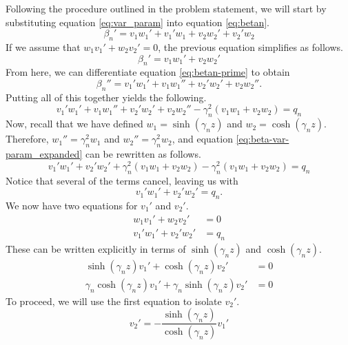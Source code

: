 Following the procedure outlined in the problem statement, we will start by substituting equation \eqref{eq:var_param} into equation \eqref{eq:betan}.
\begin{equation}
    \beta_n' = v_1 w_1' + v_1' w_1 + v_2 w_2' + v_2' w_2
\end{equation}
If we assume that $w_1 v_1' + w_2 v_2' = 0$, the previous equation simplifies as follows.
\begin{equation}
    \beta_n' = v_1 w_1' + v_2 w_2'
    \label{eq:betan-prime}
\end{equation}
From here, we can differentiate equation \eqref{eq:betan-prime} to obtain
\begin{equation}
    \beta_n'' = v_1' w_1' + v_1 w_1'' + v_2' w_2' + v_2 w_2''.
\end{equation}
Putting all of this together yields the following.
\begin{equation}
    v_1' w_1' + v_1 w_1'' + v_2' w_2' + v_2 w_2'' - \gamma_n^2(v_1 w_1 + v_2 w_2) = q_n
    \label{eq:beta-var-param_expanded}
\end{equation}
Now, recall that we have defined $w_1 = \sinh(\gamma_n z)$ and $w_2 = \cosh(\gamma_n z)$. Therefore, $w_1'' = \gamma_n^2 w_1$ and $w_2'' = \gamma_n^2 w_2$, and equation \eqref{eq:beta-var-param_expanded} can be rewritten as follows.
\begin{equation}
    v_1' w_1' + v_2' w_2' + \gamma_n^2(v_1 w_1 + v_2 w_2) - \gamma_n^2(v_1 w_1 + v_2 w_2) = q_n
\end{equation}
Notice that several of the terms cancel, leaving us with
\begin{equation}
    v_1' w_1' + v_2' w_2' = q_n.
\end{equation}
We now have two equations for $v_1'$ and $v_2'$.
\begin{align}
    w_1 v_1' + w_2 v_2' &= 0\\
    v_1' w_1' + v_2' w_2' &= q_n
\end{align}
These can be written explicitly in terms of $\sinh(\gamma_n z)$ and $\cosh(\gamma_n z)$.
\begin{align}
    \sinh(\gamma_n z) v_1' + \cosh(\gamma_n z) v_2' &= 0\\
    \gamma_n \cosh(\gamma_n z) v_1' + \gamma_n \sinh(\gamma_n z) v_2' &= 0 \label{eq:odev1v2}
\end{align}
To proceed, we will use the first equation to isolate $v_2'$.
\begin{equation}
    v_2' = -\frac{\sinh(\gamma_n z)}{\cosh(\gamma_n z)}v_1'
    \label{eq:v2prime}
\end{equation}
